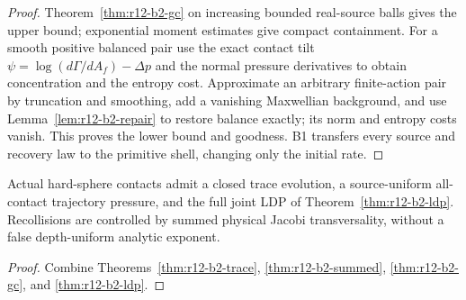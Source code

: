 \begin{proof}
Theorem~\ref{thm:r12-b2-gc} on increasing bounded real-source balls gives the
upper bound; exponential moment estimates give compact containment.  For a
smooth positive balanced pair use the exact contact tilt
$\psi=\log(d\Gamma/dA_f)-\Delta p$ and the normal pressure derivatives to
obtain concentration and the entropy cost.  Approximate an arbitrary
finite-action pair by truncation and smoothing, add a vanishing Maxwellian
background, and use Lemma~\ref{lem:r12-b2-repair} to restore balance exactly;
its norm and entropy costs vanish.  This proves the lower bound and goodness.
B1 transfers every source and recovery law to the primitive shell, changing
only the initial rate.
\end{proof}

\begin{theorem}
\label{thm:r12-b2-main}
Actual hard-sphere contacts admit a closed trace evolution, a source-uniform
all-contact trajectory pressure, and the full joint LDP of
Theorem~\ref{thm:r12-b2-ldp}.  Recollisions are controlled by summed physical
Jacobi transversality, without a false depth-uniform analytic exponent.
\end{theorem}

\begin{proof}
Combine Theorems~\ref{thm:r12-b2-trace},
\ref{thm:r12-b2-summed}, \ref{thm:r12-b2-gc}, and
\ref{thm:r12-b2-ldp}.
\end{proof}

